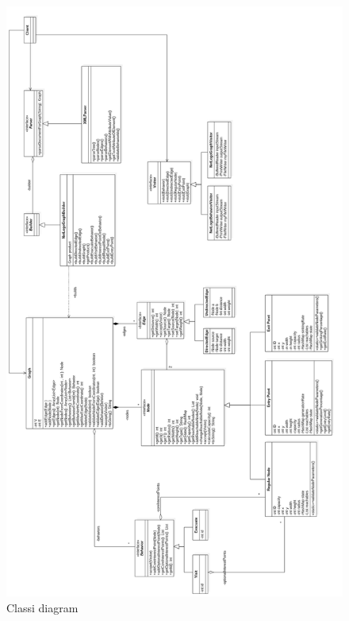 \begin{figure}[htbp]
\centering
\includegraphics[width=\textwidth,height=\textheight,keepaspectratio]{images/complete-diagram.png}
\caption{Classi diagram}
\label{fig:complete-diagram}
\end{figure}